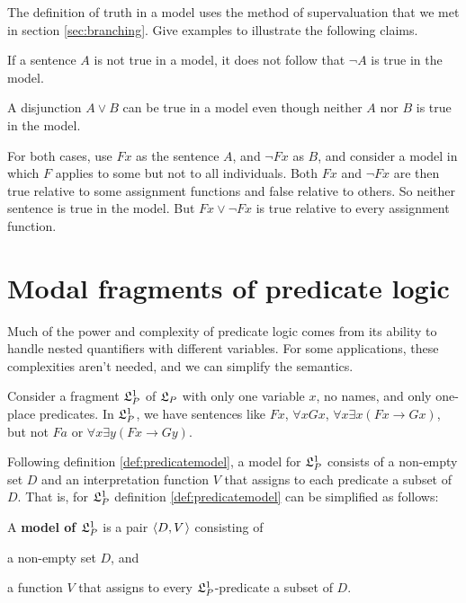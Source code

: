 \begin{exercise}
  The definition of truth in a model uses the method of supervaluation
  that we met in section \ref{sec:branching}. Give examples to illustrate the
  following claims.
  
  \begin{exlist}
  \item If a sentence $A$ is not true in a model, it does not follow that
    $\neg A$ is true in the model.
  \item A disjunction $A \lor B$ can be true in a model even though neither $A$
    nor $B$ is true in the model. 
  \end{exlist}
\end{exercise}
\begin{solution}
  For both cases, use $Fx$ as the sentence $A$, and $\neg Fx$ as $B$, and
  consider a model in which $F$ applies to some but not to all individuals. Both
  $Fx$ and $\neg Fx$ are then true relative to some assignment functions and
  false relative to others. So neither sentence is true in the model. But
  $Fx \lor \neg Fx$ is true relative to every assignment function.
\end{solution}

\section{Modal fragments of predicate logic}
\label{sec:fragment}

Much of the power and complexity of predicate logic comes from its ability to
handle nested quantifiers with different variables. For some applications, these
complexities aren't needed, and we can simplify the semantics.

Consider a fragment $\mathfrak{L}_P^1$ of $\mathfrak{L}_P$ with only one variable $x$, no names, and
only one-place predicates. In $\mathfrak{L}_P^1$, we have sentences like $Fx$,
$\forall x Gx$, $\forall x \exists x (Fx \to Gx)$, but not $Fa$ or
$\forall x \exists y(Fx \to Gy)$.

Following definition \ref{def:predicatemodel}, a model for $\mathfrak{L}_P^1$ consists of
a non-empty set $D$ and an interpretation function $V$ that assigns to each
predicate a subset of $D$. That is, for $\mathfrak{L}_{P}^{1}$ definition
\ref{def:predicatemodel} can be simplified as follows:

\begin{justabox}
  A \textbf{model of $\mathfrak{L}_P^1$} is a pair $\t{D,V}$
  consisting of \vspace{-1mm}
  \begin{itemize*}
  \item a non-empty set $D$, and
  \item a function $V$ that assigns to every $\mathfrak{L}_P^1$-predicate a subset of $D$.
  \end{itemize*}
\end{justabox}

